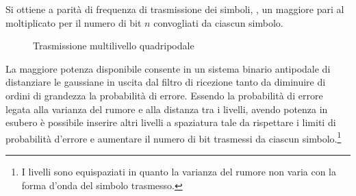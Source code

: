 Si ottiene a parità di frequenza di trasmissione dei simboli, , un maggiore  pari al  moltiplicato per il numero di bit $n$ convogliati da ciascun simbolo. 

\begin{figure}[ht!]
\centering
{}
\caption{Trasmissione multilivello quadripodale}
\end{figure}

La maggiore potenza disponibile consente in un sistema binario antipodale di distanziare le gaussiane in uscita dal filtro di ricezione tanto da diminuire di ordini di grandezza la probabilità di errore. Essendo la probabilità di errore legata alla varianza del rumore e alla distanza tra i livelli, avendo potenza in esubero è possibile inserire altri livelli a spaziatura tale da rispettare i limiti di probabilità d'errore e aumentare il numero di bit trasmessi da ciascun simbolo.\footnote{I livelli sono equispaziati in quanto la varianza del rumore non varia con la forma d'onda del simbolo trasmesso.} 

